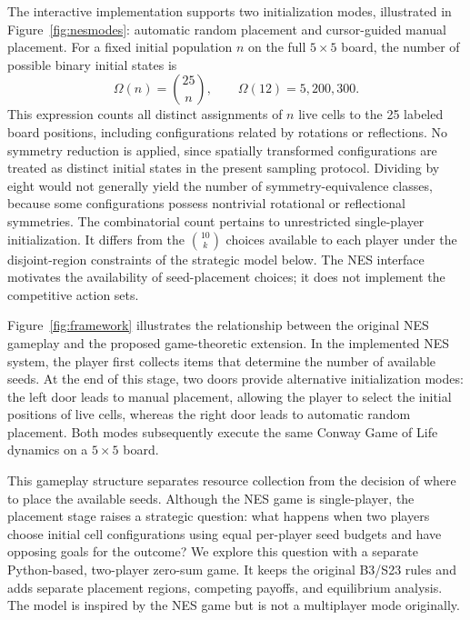 \documentclass[games,article,submit,moreauthors]{Definitions/mdpi}
\begin{document}
The interactive implementation supports two initialization modes, illustrated in Figure~\ref{fig:nesmodes}: automatic random placement and cursor-guided manual placement. For a fixed initial population $n$ on the full $5\times5$ board, the number of possible binary initial states is
\begin{equation}\label{eq:fullconfigs}
\Omega(n)=\binom{25}{n},\qquad \Omega(12)=5{,}200{,}300.
\end{equation}
This expression counts all distinct assignments of $n$ live cells to the 25 labeled board positions, including configurations related by rotations or reflections. No symmetry reduction is applied, since spatially transformed configurations are treated as distinct initial states in the present sampling protocol. Dividing by eight would not generally yield the number of symmetry-equivalence classes, because some configurations possess nontrivial rotational or reflectional symmetries. The combinatorial count pertains to unrestricted single-player initialization. It differs from the $\binom{10}{k}$ choices available to each player under the disjoint-region constraints of the strategic model below. The NES interface motivates the availability of seed-placement choices; it does not implement the competitive action sets.

Figure~\ref{fig:framework} illustrates the relationship between the original NES gameplay and the proposed game-theoretic extension. In the implemented NES system, the player first collects items that determine the number of available seeds. At the end of this stage, two doors provide alternative initialization modes: the left door leads to manual placement, allowing the player to select the initial positions of live cells, whereas the right door leads to automatic random placement. Both modes subsequently execute the same Conway Game of Life dynamics on a $5\times5$ board.

This gameplay structure separates resource collection from the decision of where to place the available seeds. Although the NES game is single-player, the placement stage raises a strategic question: what happens when two players choose initial cell configurations using equal per-player seed budgets and have opposing goals for the outcome? We explore this question with a separate Python-based, two-player zero-sum game. It keeps the original B3/S23 rules and adds separate placement regions, competing payoffs, and equilibrium analysis. The model is inspired by the NES game but is not a multiplayer mode originally.
\end{document}
